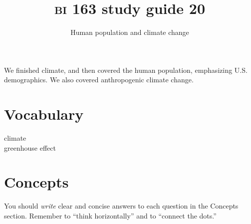 \documentclass[letterpaper]{tufte-handout}
\title{{\scshape bi} 163 study guide 20}
\author{Human population and climate change }
\date{} %
\begin{document}
\maketitle	%

We finished climate, and then covered the human population, emphasizing U.S. demographics. We also covered anthropogenic climate change.

\section*{Vocabulary}

\vspace{-1\baselineskip}
\begin{multicols}{2}
climate \\
greenhouse effect
\end{multicols}

\section*{Concepts}

You should \emph{write} clear and concise answers to each question in the Concepts section.  Remember to ``think horizontally'' and to ``connect the dots.'' 
\end{document}
